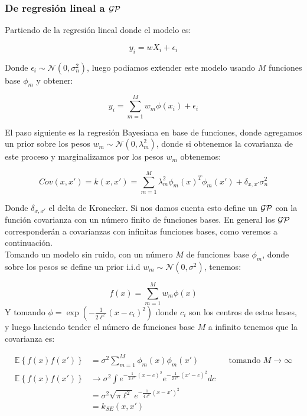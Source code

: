\subsubsection{De regresión lineal a $\mathcal{GP}$}

Partiendo de la regresión lineal donde el modelo es:

\begin{equation}
	y_i = w X_i + \epsilon_i
\end{equation}

Donde $\epsilon_i \sim \mathcal{N}(0, \sigma_n^2)$, luego podíamos extender este modelo usando $M$ funciones base $\phi_m$ y obtener:

\begin{equation}
	y_i = \sum_{m=1}^{M} w_m \phi(x_i) + \epsilon_i
\end{equation}

El paso siguiente es la regresión Bayesiana en base de funciones, donde agregamos un prior sobre los pesos $w_m \sim \mathcal{N}(0, \lambda_m^2)$, donde si obtenemos la covarianza de este proceso y marginalizamos por los pesos $w_m$ obtenemos:

\begin{equation}
	Cov(x, x') = k(x, x') = \sum_{m=1}^{M} \lambda_m^2 \phi_m(x)^T\phi_m(x') + \delta_{x, x'} \sigma_n^2
\end{equation}

Donde $\delta_{x, x'}$ el delta de Kronecker. Si nos damos cuenta esto define un $\mathcal{GP}$ con la función covarianza con un número finito de funciones bases. En general los $\mathcal{GP}$ corresponderán a covarianzas con infinitas funciones bases, como veremos a continuación.\\

Tomando un modelo sin ruido, con un número $M$ de funciones base $\phi_m$, donde sobre los pesos se define un prior i.i.d $w_m \sim \mathcal{N}(0, \sigma^2)$, tenemos:

\begin{equation}
	f(x) =  \sum_{m=1}^{M} w_m \phi(x)
\end{equation}
Y tomando $\phi=\exp(-\frac{1}{2\ell^2}(x- c_i)^2)$ donde $c_i$ son los centros de estas bases, y luego haciendo tender el número de funciones base $M$ a infinito tenemos que la covarianza es:

\begin{align}
	\mathbb{E}\left\{f(x) f(x')\right\} & = \sigma^2\sum_{m=1}^{M}  \phi_m(x)\phi_m(x') && \text{tomando } M\rightarrow \infty\\
	\mathbb{E}\left\{f(x) f(x')\right\} & \rightarrow \sigma^2 \int e^{-\frac{1}{2\ell^2}(x- c)^2} e^{-\frac{1}{2\ell^2}(x'- c)^2} dc \\
	& = \sigma^2 \sqrt{\pi\ell^2} e^{-\frac{1}{4\ell^2}(x- x')^2}\\
	& = k_{SE}(x, x')
\end{align}

